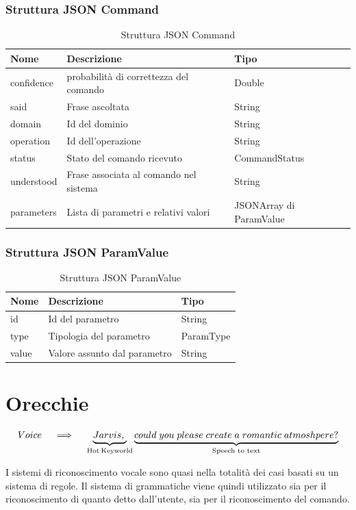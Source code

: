 \documentclass[twoside]{supsistudent}
\begin{document}
\subsection{Struttura JSON Command}
\begin{table}[H]
\centering
\caption{Struttura JSON Command}
\label{Struttura JSON Command}
\begin{tabular}{|l|l|l|}
\hline
Nome            & Descrizione                            & Tipo                        \\ \hline
confidence          & probabilità di correttezza del comando                     & Double                      \\ \hline
said            & Frase ascoltata                        & String                      \\ \hline
domain          & Id del dominio                         & String                      \\ \hline
operation       & Id dell'operazione                     & String                      \\ \hline
status       & Stato del comando ricevuto                    & CommandStatus                      \\ \hline
understood      & Frase associata al comando nel sistema & String                      \\ \hline
parameters & Lista di parametri e relativi valori   & JSONArray di ParamValue \\ \hline
\end{tabular}
\end{table}
\subsection{Struttura JSON ParamValue}
\begin{table}[H]
\centering
\caption{Struttura JSON ParamValue}
\label{Struttura JSON ParamValue}
\begin{tabular}{|l|l|l|}
\hline
Nome  & Descrizione                  & Tipo      \\ \hline
id    & Id del parametro             & String    \\ \hline
type  & Tipologia del parametro      & ParamType \\ \hline
value & Valore assunto dal parametro & String    \\ \hline
\end{tabular}
\end{table}

\chapter{Orecchie}
\begin{center}
\[
 Voice \quad\implies\quad
\underbrace{Jarvis,\;}_\text{Hot\:Keyworld}
\underbrace{could\;you\;please\;create\;a\;romantic\;atmoshpere?}_\text{Speech to text}
\]
\end{center}
I sistemi di riconoscimento vocale sono quasi nella totalità dei casi basati su un sistema di regole. Il sistema di grammatiche viene quindi utilizzato sia per il riconoscimento di quanto detto dall'utente, sia per il riconoscimento del comando.
\end{document}
